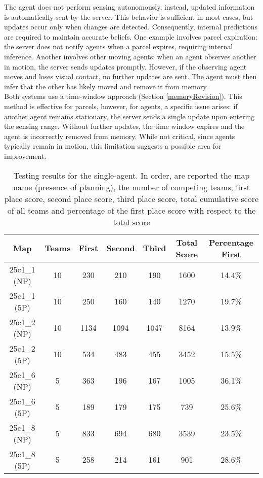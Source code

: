         The agent does not perform sensing autonomously, instead, updated information is automatically sent by the server. This behavior is sufficient in most cases, but updates occur only when changes are detected. Consequently, internal predictions are required to maintain accurate beliefs. One example involves parcel expiration: the server does not notify agents when a parcel expires, requiring internal inference. Another involves other moving agents: when an agent observes another in motion, the server sends updates promptly. However, if the observing agent moves and loses visual contact, no further updates are sent. The agent must then infer that the other has likely moved and remove it from memory.
        \medskip\\
        Both systems use a time-window approach (Section \ref{memoryRevision}). This method is effective for parcels, however, for agents, a specific issue arises: if another agent remains stationary, the server sends a single update upon entering the sensing range. Without further updates, the time window expires and the agent is incorrectly removed from memory. While not critical, since agents typically remain in motion, this limitation suggests a possible area for improvement.


\newpage

\begin{table}[H]
    \centering
    \begin{tabular}{|c|c|c|c|c|c|c|}
        \hline
        Map & Teams & First & Second & Third & Total Score & Percentage First \\
        \hline
        25c1\_1 (NP)  & 10   & 230   & 210   & 190  & 1600  & 14.4\% \\
        25c1\_1 (5P)  & 10   & 250   & 160   & 140  & 1270  & 19.7\% \\
        25c1\_2 (NP)  & 10  & 1134  & 1094  & 1047  & 8164  & 13.9\% \\
        25c1\_2 (5P)  & 10   & 534   & 483   & 455  & 3452  & 15.5\% \\
        25c1\_6 (NP)   & 5   & 363   & 196   & 167  & 1005  & 36.1\% \\
        25c1\_6 (5P)   & 5   & 189   & 179   & 175   & 739  & 25.6\% \\
        25c1\_8 (NP)   & 5   & 833   & 694   & 680  & 3539  & 23.5\% \\
        25c1\_8 (5P)   & 5   & 258   & 214   & 161   & 901  & 28.6\% \\
        \hline
    \end{tabular}
    \caption{Testing results for the single-agent. In order, are reported the map name (presence of planning), the number of competing teams, first place score, second place score, third place score, total cumulative score of all teams and percentage of the first place score with respect to the total score}
    \label{tab:table_1}
\end{table}

